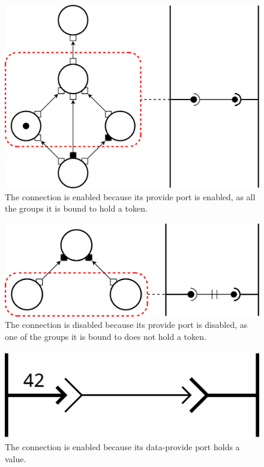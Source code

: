 \begin{figure}[t]
  \begin{center}
    \includegraphics[width=0.7\columnwidth]{./images/enabled_service.pdf}

    \caption{The connection is enabled because its provide port is enabled, as all the groups it is bound to hold a token.}

    \label{fig:enabled_service}
  \end{center}
\end{figure}

\begin{figure}[t]
\begin{center}
  \includegraphics[width=0.7\columnwidth]{./images/disabled_service.pdf}
\end{center}
\caption{The connection is disabled because its provide port is disabled, as one of the groups it is bound to does not hold a token.}
\label{fig:disabled_service}
\end{figure}

\begin{figure}[t]
\begin{center}
  \includegraphics[width=0.4\columnwidth]{./images/enabled_data.pdf}
\end{center}
\caption{The connection is enabled because its data-provide port holds a value.}
\label{fig:enabled_data}
\end{figure}

